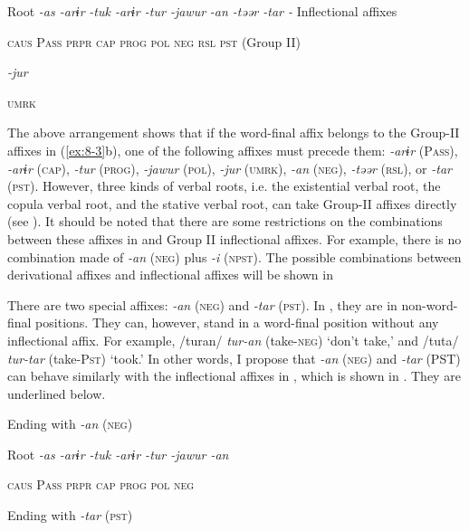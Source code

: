   Root  \textit{{}-as  {}-arɨr} %
\textit{{}-tuk  {}-arɨr  {}-tur  {}-jawur} %
\textit{{}-an  {}-təər  {}-tar  {}-} Inflectional affixes

    \textsc{caus}  P\textsc{ass}  \textsc{prpr}  \textsc{cap}  \textsc{prog}  \textsc{pol}  \textsc{neg}  \textsc{rsl}  \textsc{pst}  (Group II)

          \textit{{}-jur} 

          \textsc{umrk}

The above arrangement shows that if the word-final affix belongs to the Group-II affixes in (\ref{ex:8-3}b), one of the following affixes must precede them: \textit{{}-arɨr} (P\textsc{ass}), \textit{-arɨr} (\textsc{cap}), \textit{-tur} (\textsc{prog}), \textit{{}-jawur} (\textsc{pol}), \textit{{}-jur} (\textsc{umrk}), \textit{{}-an} (\textsc{neg}), \textit{{}-təər} (\textsc{rsl}), or \textit{{}-tar} (\textsc{pst}). However, three kinds of verbal roots, i.e. the existential verbal root, the copula verbal root, and the stative verbal root, can take Group-II affixes directly (see ). It should be noted that there are some restrictions on the combinations between these affixes in  and Group II inflectional affixes. For example, there is no combination made of \textit{{}-an} (\textsc{neg}) plus \textit{{}-i} (\textsc{npst}). The possible combinations between derivational affixes and inflectional affixes will be shown in 

There are two special affixes: \textit{{}-an} (\textsc{neg}) and \textit{-tar} (\textsc{pst}). In , they are in non-word-final positions. They can, however, stand in a word-final position without any inflectional affix. For example, /turan/ \textit{tur-an} (take-\textsc{neg}) ‘don’t take,’ and /tuta/ \textit{tur-tar} (take-P\textsc{st}) ‘took.’ In other words, I propose that \textit{{}-an} (\textsc{neg}) and \textit{-tar} (PST) can behave similarly with the inflectional affixes in , which is shown in . They are underlined below.

\ea\label{ex:8-6}
\ea Ending with \textit{{}-an} (\textsc{neg})

    Root  \textit{{}-as  {}-arɨr  {}-tuk  {}-arɨr  {}-tur  {}-jawur  {}-an}   

      \textsc{caus}  P\textsc{ass}  \textsc{prpr}  \textsc{cap}  \textsc{prog}  \textsc{pol}  \textsc{neg}

\ex Ending with \textit{{}-tar} (\textsc{pst})

